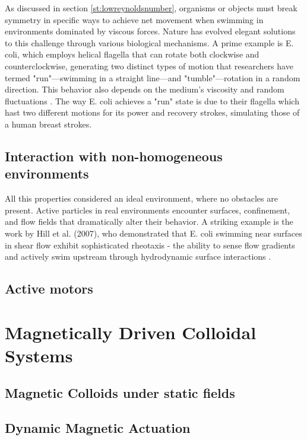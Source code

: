 As discussed in section \ref{st:lowreynoldsnumber}, organisms or objects must break symmetry in specific ways to achieve net movement when swimming in environments dominated by viscous forces. Nature has evolved elegant solutions to this challenge through various biological mechanisms. A prime example is E. coli, which employs helical flagella that can rotate both clockwise and counterclockwise, generating two distinct types of motion that researchers have termed "run"—swimming in a straight line—and "tumble"—rotation in a random direction. This behavior also depends on the medium's viscosity and random fluctuations \cite{kumar2010physics}. The way E. coli achieves a "run" state is due to their flagella which hast two different motions for its power and recovery strokes, simulating those of a human breast strokes. 


\section{Interaction with non-homogeneous environments}

All this properties considered an ideal environment, where no obstacles are present. Active particles in real environments encounter surfaces, confinement, and flow fields that dramatically alter their behavior. A striking example is the work by Hill et al. (2007), who demonstrated that E. coli swimming near surfaces in shear flow exhibit sophisticated rheotaxis - the ability to sense flow gradients and actively swim upstream through hydrodynamic surface interactions \cite{hill2007hydrodynamic}. 

\section{Active motors}


\chapter{Magnetically Driven Colloidal Systems}
\label{magneticallydrivencolloidalsystems}

\section{Magnetic Colloids under static fields}

\section{Dynamic Magnetic Actuation}

